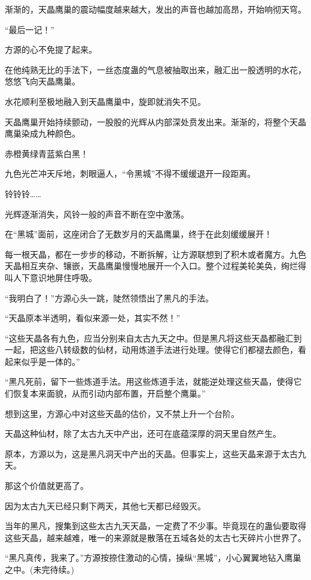 \begin{this_body}
渐渐的，天晶鹰巢的震动幅度越来越大，发出的声音也越加高昂，开始响彻天穹。

“最后一记！”

方源的心不免提了起来。

在他纯熟无比的手法下，一丝态度蛊的气息被抽取出来，融汇出一股透明的水花，悠悠飞向天晶鹰巢。

水花顺利至极地融入到天晶鹰巢中，旋即就消失不见。

天晶鹰巢开始持续颤动，一股股的光辉从内部深处贲发出来。渐渐的，将整个天晶鹰巢染成九种颜色。

赤橙黄绿青蓝紫白黑！

九色光芒冲天斥地，刺眼逼人，“令黑城”不得不缓缓退开一段距离。

铃铃铃……

光辉逐渐消失，风铃一般的声音不断在空中激荡。

在“黑城”面前，这座闭合了无数岁月的天晶鹰巢，终于在此刻缓缓展开！

每一根天晶，都在一步步的移动，不断拆解，让方源联想到了积木或者魔方。九色天晶相互夹杂、镶嵌，天晶鹰巢慢慢地展开一个入口。整个过程美轮美奂，绚烂得叫人下意识地屏住呼吸。

“我明白了！”方源心头一跳，陡然领悟出了黑凡的手法。

“天晶原本半透明，看似来源一处，其实不然！”

“这些天晶各有九色，应当分别来自太古九天之中。但是黑凡将这些天晶都融汇到一起，把这些八转级数的仙材，动用炼道手法进行处理。使得它们都褪去颜色，看起来似乎是一体的。”

“黑凡死前，留下一些炼道手法。用这些炼道手法，就能逆处理这些天晶，使得它们恢复本来面貌，从而引动内部布置，开启整个鹰巢。”

想到这里，方源心中对这些天晶的估价，又不禁上升一个台阶。

天晶这种仙材，除了太古九天中产出，还可在底蕴深厚的洞天里自然产生。

原本，方源以为，这是黑凡洞天中产出的天晶。但事实上，这些天晶来源于太古九天。

那这个价值就更高了。

因为太古九天已经只剩下两天，其他七天都已经毁灭。

当年的黑凡，搜集到这些太古九天天晶，一定费了不少事。毕竟现在的蛊仙要取得这些天晶，越来越难，唯一的来源就是散落在五域各处的太古七天碎片小世界了。

“黑凡真传，我来了。”方源按捺住激动的心情，操纵“黑城”，小心翼翼地钻入鹰巢之中。(未完待续。)

\end{this_body}

